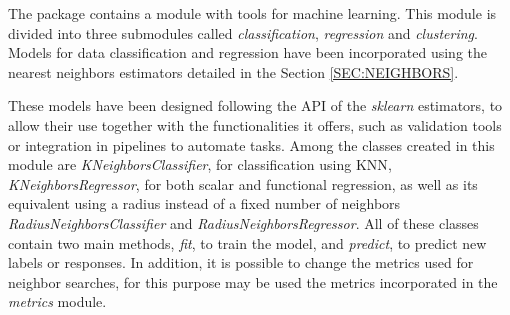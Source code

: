 

The package contains a module with tools for machine learning.
This module is divided into three submodules called \textit{classification},
\textit{regression} and \textit{clustering}.
Models for data classification and regression have been incorporated using
the nearest neighbors estimators detailed in the Section \ref{SEC:NEIGHBORS}.

These models have been designed following the \acs{API} of the \textit{sklearn} estimators,
to allow their use together with the functionalities it offers, such as
validation tools or integration in pipelines to automate tasks.
Among the classes created in this module are \textit{KNeighborsClassifier},
for classification using \acs{KNN}, \textit{KNeighborsRegressor},
for both scalar and functional regression,
as well as its equivalent using a radius instead of a fixed number of neighbors
\textit{RadiusNeighborsClassifier} and \textit{RadiusNeighborsRegressor}.
All of these classes contain two main methods, \textit{fit}, to train the model,
and \textit{predict}, to predict new labels or responses.
In addition, it is possible to change the metrics used for neighbor searches,
for this purpose  may be used the metrics incorporated in the \textit{metrics}
module.
